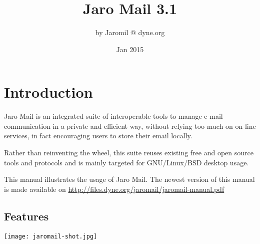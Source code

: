 \documentclass[a4,onecolumn,portrait]{article}
\author{by Jaromil @ dyne.org}
\date{Jan 2015}
\title{Jaro Mail 3.1}
\begin{document}
\maketitle
\tableofcontents

\fancyhf{}
\fancyfoot[C]{-- \thepage\ --}

\renewcommand{\headrulewidth}{0.4pt}
\renewcommand{\footrulewidth}{0.4pt}


\pagebreak


\section{Introduction}
\label{sec-1}

Jaro Mail is an integrated suite of interoperable tools to manage
e-mail communication in a private and efficient way, without relying
too much on on-line services, in fact encouraging users to store their
email locally.

Rather than reinventing the wheel, this suite reuses existing free and
open source tools and protocols and is mainly targeted for
GNU/Linux/BSD desktop usage.

This manual illustrates the usage of Jaro Mail. The newest version of
this manual is made available on \url{http://files.dyne.org/jaromail/jaromail-manual.pdf}

\subsection{Features}
\label{sec-1-1}

\texttt{[image: jaromail-shot.jpg]}
\end{document}
